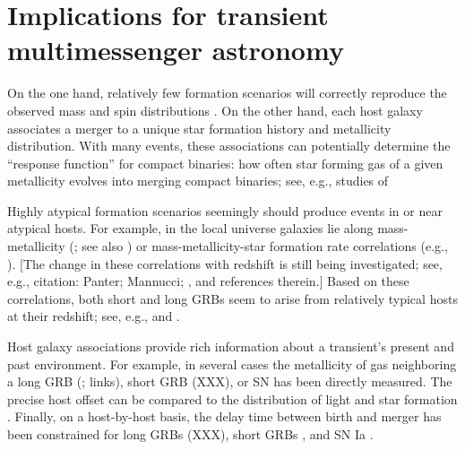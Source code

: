 \documentclass[nofootinbib,twocolumn,prd]{emulateapj}
\newcommand\editremark[1]{{\color{red}#1}}
\begin{document}
\section{Implications for transient multimessenger astronomy}



On the one hand,  relatively few formation scenarios will correctly reproduce the observed mass and spin distributions
\citep{2004MNRAS.352.1372B,2003ApJ...589L..37B,gwastro-Ilya-ConfProc-NRDA-2010}.  
On the other hand, each host galaxy associates a merger to a unique star formation history and metallicity distribution.
With many events, these associations can potentially determine the ``response function'' for compact binaries: how often star forming gas of a given metallicity evolves into
merging compact binaries;  see, e.g., studies of

%
Highly atypical formation scenarios seemingly should produce events in or near atypical hosts.  
For example, in the local universe galaxies lie along mass-metallicity  (\cite{2004ApJ...613..898T}; see also
\cite{sfr-ZEvolution-ByGalaxy-Panter2008})
or mass-metallicity-star formation rate  correlations (e.g., \cite{2010MNRAS.408.2115M}).
[The change in these correlations with redshift is still being investigated; see, e.g., \editremark{citation: Panter;
    Mannucci; }, \cite{2011ApJ...739....1L} and references therein.]
Based on these correlations, both short  and long GRBs seem to arise from
relatively typical hosts at their redshift; see, e.g., \cite{grb-short-Hosts-Berger2008} and \cite{grb-long-HostMetallicityVsTrend-Mannucci2010}.


Host galaxy associations provide rich information about a transient's present and past environment.
%
For example, in several cases the metallicity of gas neighboring a long GRB (\citet{ 2008AJ....135.1136M}; \citet{2010AJ....140.1557L}
\editremark{links}), short GRB (\editremark{XXX}), or SN has been directly measured.
%
The precise host offset can be compared to the distribution of light and star formation  \citep{2010ApJ...708....9F}.
%
Finally,  on a host-by-host basis, the delay time between birth and merger has been constrained for long GRBs (\editremark{XXX}), short GRBs \citep{2010ApJ...725.1202L}, and
  SN Ia \citep{2011MNRAS.412.1508M}.
%
\end{document}
